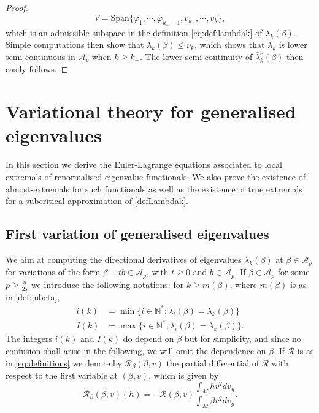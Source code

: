 \documentclass[10pt]{amsart}
\numberwithin{equation}{section}
\newcommand{\N}{\mathbb{N}}
\newcommand{\vp}{\varphi}
\theoremstyle{plain}
\theoremstyle{remark}
\begin{document}
\begin{proof}
$$ V = \text{Span} \big\{ \vp_1, \cdots, \vp_{k_+-1}, v_{k_+}, \cdots, v_k\big\}, $$
which is an admissible subspace in the definition \eqref{eq:def:lambdak} of $\lambda_k(\beta)$. Simple computations then show that $\lambda_k(\beta) \le \nu_k$, which shows that $\lambda_k$ is lower semi-continuous in $\mathcal{A}_p$ when $k\geq k_+$. The lower semi-continuity of $ \bar{\lambda}_k^p(\beta)$ then easily follows. 
\end{proof}


\section{Variational theory for generalised eigenvalues} \label{sec:theorievariationnellevp}

In this section we derive the Euler-Lagrange equations associated to local extremals of renormalised eigenvalue functionals. We also prove the existence of almost-extremals for such functionals as well as the existence of true extremals for a subcritical approximation of \eqref{defLambdak}. 

\subsection{First variation of generalised eigenvalues}
We aim at computing the directional derivatives of eigenvalues $\lambda_k(\beta)$ at $\beta \in \mathcal{A}_p$ for variations of the form $\beta +t b \in \mathcal{A}_p$,  with $t \ge 0$ and $ b \in \mathcal{A}_p$. If $\beta \in \mathcal{A}_p$ for some $p \ge \frac{n}{2s}$ we introduce the following notations: for $k \ge m(\beta)$, where $m(\beta)$ is as in \eqref{def:mbeta},
\begin{equation} \label{def:petitgrand:i}
\begin{aligned} 
i(k) & = \min\{ i \in \N^* ; \lambda_i(\beta) = \lambda_k(\beta) \} \\
I(k) & = \max\{ i \in \N^* ; \lambda_i(\beta) = \lambda_k(\beta) \}.
\end{aligned}
\end{equation}
The integers $i(k)$ and $I(k)$ do depend on $\beta$ but for simplicity, and since no confusion shall arise in the following, we will omit the dependence on $\beta$. If $\mathcal{R}$ is as in \eqref{eq:definitions} we denote by $\mathcal{R}_\beta(\beta,v)$ the partial differential of $\mathcal{R}$ with respect to the first variable at $(\beta,v)$, which is given by 
\begin{equation} 
\label{eq:def:rbetah} 
\mathcal{R}_{\beta}(\beta,v) (h) = -\mathcal{R}(\beta,v) \frac{\int_M h v^2 dv_g}{\int_M \beta v^2 dv_g}. 
\end{equation}
\end{document}
